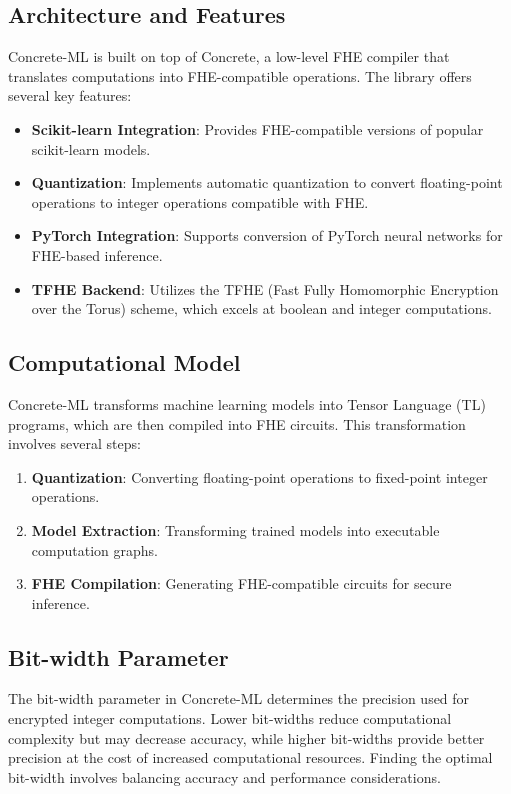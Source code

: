 \documentclass[a4paper,12pt]{article}
\begin{document}
\subsection{Architecture and Features}
Concrete-ML is built on top of Concrete, a low-level FHE compiler that translates computations into FHE-compatible operations. The library offers several key features:

\begin{itemize}
    \item \textbf{Scikit-learn Integration}: Provides FHE-compatible versions of popular scikit-learn models.
    \item \textbf{Quantization}: Implements automatic quantization to convert floating-point operations to integer operations compatible with FHE.
    \item \textbf{PyTorch Integration}: Supports conversion of PyTorch neural networks for FHE-based inference.
    \item \textbf{TFHE Backend}: Utilizes the TFHE (Fast Fully Homomorphic Encryption over the Torus) scheme, which excels at boolean and integer computations.
\end{itemize}

\subsection{Computational Model}
Concrete-ML transforms machine learning models into Tensor Language (TL) programs, which are then compiled into FHE circuits. This transformation involves several steps:

\begin{enumerate}
    \item \textbf{Quantization}: Converting floating-point operations to fixed-point integer operations.
    \item \textbf{Model Extraction}: Transforming trained models into executable computation graphs.
    \item \textbf{FHE Compilation}: Generating FHE-compatible circuits for secure inference.
\end{enumerate}

\subsection{Bit-width Parameter}
The bit-width parameter in Concrete-ML determines the precision used for encrypted integer computations. Lower bit-widths reduce computational complexity but may decrease accuracy, while higher bit-widths provide better precision at the cost of increased computational resources. Finding the optimal bit-width involves balancing accuracy and performance considerations.
\end{document}
